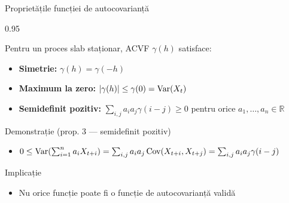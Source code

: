 \documentclass[9pt, aspectratio=169, t]{beamer}
\begin{document}
\begin{frame}{Proprietățile funcției de autocovarianță}
    \begin{cminipage}{0.95\textwidth}
        \small
        \begin{prop}
            Pentru un proces slab staționar, ACVF $\gamma(h)$ satisface:
            \begin{itemize}\setlength{\itemsep}{0pt}
                \item \textbf{Simetrie:} $\gamma(h) = \gamma(-h)$
                \item \textbf{Maximum la zero:} $|\gamma(h)| \leq \gamma(0) = \text{Var}(X_t)$
                \item \textbf{Semidefinit pozitiv:} $\sum_{i,j} a_i a_j \gamma(i - j) \geq 0$ pentru orice $a_1, \ldots, a_n \in \mathbb{R}$
            \end{itemize}
        \end{prop}

        \begin{alertblock}{Demonstrație (prop. 3 --- semidefinit pozitiv)}
            \begin{itemize}\setlength{\itemsep}{0pt}
                \item {\footnotesize $0 \leq \text{Var}\!\left(\sum_{i=1}^n a_i X_{t+i}\right) = \sum_{i,j} a_i a_j \,\text{Cov}(X_{t+i}, X_{t+j}) = \sum_{i,j} a_i a_j \gamma(i-j)$}
            \end{itemize}
        \end{alertblock}

        \begin{exampleblock}{Implicație}
            \begin{itemize}\setlength{\itemsep}{0pt}
                \item Nu orice funcție poate fi o funcție de autocovarianță validă
            \end{itemize}
        \end{exampleblock}
    \end{cminipage}
\end{frame}
\end{document}
